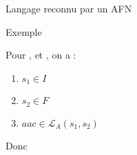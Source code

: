 \begin{frame}{Langage reconnu par un AFN}
\begin{exampleblock}{Exemple}
\begin{minipage}{.4\textwidth}
{}\end{minipage}%
    \begin{minipage}{.6\textwidth}
      Pour ,  et , on a : 
      \begin{enumerate}
      \item $s_1 \in I$
      \item $s_2 \in F$
      \item $aac \in \mathcal{L}_A(s_1, s_2)$
      \end{enumerate}
      Donc 
    \end{minipage}
  \end{exampleblock}
\end{frame}


\endgroup
